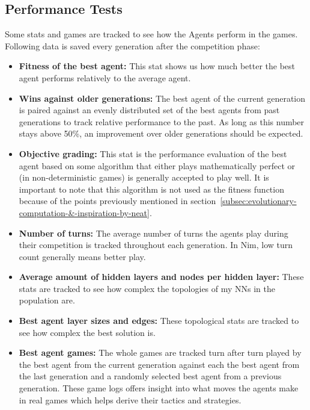     \subsection{Performance Tests}\label{subsec:performance-tests}
    Some stats and games are tracked to see how the Agents perform in the games.
    Following data is saved every generation after the competition phase:
    \begin{itemize}
        \item \textbf{Fitness of the best agent:} This stat shows us how much better the best agent performs relatively to the average agent.
        \item \textbf{Wins against older generations:} The best agent of the current generation is paired against an evenly distributed set of the best agents from past generations to track relative performance to the past.
        As long as this number stays above 50\%, an improvement over older generations should be expected.
        \item \textbf{Objective grading:} This stat is the performance evaluation of the best agent based on some algorithm that either plays mathematically perfect or (in non-deterministic games) is generally accepted to play well.
        It is important to note that this algorithm is not used as the fitness function because of the points previously mentioned in section~\ref{subsec:evolutionary-computation-&-inspiration-by-neat}.
        \item \textbf{Number of turns:} The average number of turns the agents play during their competition is tracked throughout each generation.
        In Nim, low turn count generally means better play.
        \item \textbf{Average amount of hidden layers and nodes per hidden layer:} These stats are tracked to see how complex the topologies of my NNs in the population are.
        \item \textbf{Best agent layer sizes and edges:} These topological stats are tracked to see how complex the best solution is.
        \item \textbf{Best agent games:} The whole games are tracked turn after turn played by the best agent from the current generation against each the best agent from the last generation and a randomly selected best agent from a previous generation.
        These game logs offers insight into what moves the agents make in real games which helps derive their tactics and strategies.
    \end{itemize}

